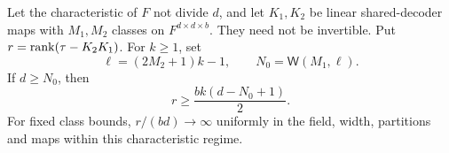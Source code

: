 \begin{theorem}\label{thm:two-stage-rank}
Let the characteristic of $F$ not divide $d$, and let $K_1,K_2$ be
linear shared-decoder maps with $M_1,M_2$ classes on
$F^{d\times d\times b}$.  They need not be invertible.  Put
$r=\operatorname{rank}(\tau-K_2K_1)$.
For $k\ge1$, set
\[
 \ell=(2M_2+1)k-1,\qquad N_0=\mathsf W(M_1,\ell).
\]
If $d\ge N_0$, then
\begin{equation}\label{eq:rank-deficit}
 r\ge \frac{bk(d-N_0+1)}2.
\end{equation}
For fixed class bounds, $r/(bd)\to\infty$ uniformly in the field,
width, partitions and maps within this characteristic regime.
\end{theorem}
